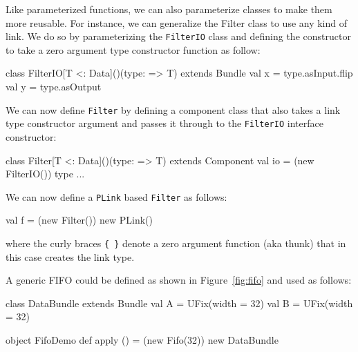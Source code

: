 \documentclass[twocolumn,10pt]{article}
\begin{document}
Like parameterized functions, we can also parameterize classes to make them more reusable.
For instance, we can generalize the Filter class to use any kind of link.  
We do so by parameterizing the \verb+FilterIO+ class and defining the constructor to take a zero argument type constructor function as follow:

\begin{scala}
class FilterIO[T <: Data]()(type: => T) extends Bundle { 
  val x = type.asInput.flip
  val y = type.asOutput
}
\end{scala}

\noindent
We can now define \verb+Filter+ by defining a component class that also takes a link type constructor argument and passes it through to the \verb+FilterIO+ interface constructor:

\begin{scala}
class Filter[T <: Data]()(type: => T) extends Component { 
  val io = (new FilterIO()){ type }
  ...
}
\end{scala}

\noindent
We can now define a \verb+PLink+ based \verb+Filter+ as follows:
\begin{scala}
val f = (new Filter()){ new PLink() }
\end{scala}

\noindent
where the curly braces \verb+{ }+ denote a zero argument function (aka thunk) that in this case creates the link type.

A generic FIFO could be defined as shown in Figure~\ref{fig:fifo} and
used as follows:

\begin{scala}
class DataBundle extends Bundle {
  val A = UFix(width = 32)
  val B = UFix(width = 32)
}

object FifoDemo {
  def apply () = (new Fifo(32)){ new DataBundle }
}
\end{scala}
\end{document}

